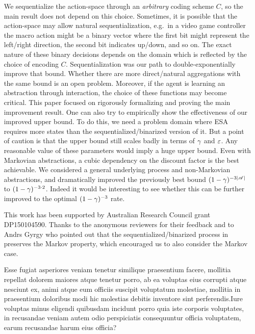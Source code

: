 \documentclass{article} %
\renewcommand{\bibstylename}{aaai21} %
\renewcommand{\bibstylename}{apalike}
\renewcommand{\bibstylename}{unsrtnat}
\begin{document}
We sequentialize the action-space through an \emph{arbitrary} coding scheme $C$, so the main result does not depend on this choice. Sometimes, it is possible that the action-space may allow natural sequentialization, e.g.\ in a video game controller the macro action might be a binary vector where the first bit might represent the left/right direction, the second bit indicates up/down, and so on. The exact nature of these binary decisions depends on the domain which is reflected by the choice of encoding $C$. Sequentialization was our path to double-exponentially improve that bound. Whether there are more direct/natural aggregations with the same bound is an open problem. Moreover, if the agent is learning an abstraction through interaction, the choice of these functions may become critical.  
This paper focused on rigorously formalizing and proving the main improvement result. One can also try to empirically show the effectiveness of our improved upper bound. To do this, we need a problem domain where ESA requires more states than the sequentialized/binarized version of it. But a point of caution is that the upper bound still scales badly in terms of $\gamma$ and $\varepsilon$. Any reasonable value of these parameters would imply a huge upper bound.
Even with Markovian abstractions, a cubic dependency on the discount factor is the best achievable.
We considered a general underlying process and non-Markovian abstractions,
and dramatically improved the previously best bound $(1-\gamma)^{-3|\mathscr{A}|}$ to $(1-\gamma)^{-3\cdot 2}$.
Indeed it would be interesting to see whether this can be further improved to the optimal $(1-\gamma)^{-3}$ rate.

This work has been supported by Australian Research Council grant  DP150104590. Thanks to the anonymous reviewers for their feedback and to Andrs Gyrgy who pointed out that the sequentialized/binarized process in  preserves the Markov property, which encouraged us to also consider the Markov case.

\begin{small}

Esse fugiat asperiores veniam tenetur similique praesentium facere, mollitia repellat dolorem maiores atque tenetur porro, ab ea voluptas eius corrupti atque nesciunt ex, animi atque eum officiis suscipit voluptatum molestiae, mollitia in praesentium doloribus modi hic molestias debitis inventore sint perferendis.Iure voluptas minus eligendi quibusdam incidunt porro quia iste corporis voluptates, in recusandae veniam autem odio perspiciatis consequuntur officia voluptatem, earum recusandae harum eius officia?\clearpage

\end{small}
\end{document}
